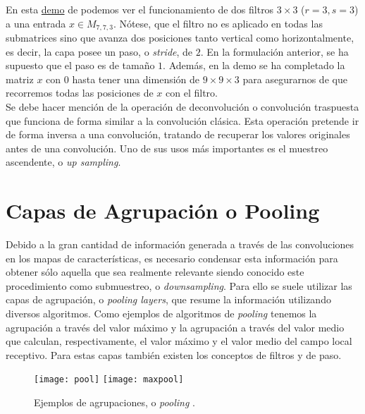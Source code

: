 \begin{itemize}
En esta \href{https://cs231n.github.io/assets/conv-demo/index.html}{demo} de \cite{stanford} podemos ver el funcionamiento de dos filtros $3\times 3$ ($r=3,s=3$) a una entrada $x\in M_{7,7,3}$. Nótese, que el filtro no es aplicado en todas las submatrices sino que avanza dos posiciones tanto vertical como horizontalmente, es decir, la capa posee un paso, o \emph{stride}, de $2$. En la formulación anterior, se ha supuesto que el paso es de tamaño $1$. Además, en la demo se ha completado la matriz $x$ con $0$ hasta tener una dimensión de $9\times 9\times 3$ para asegurarnos de que recorremos todas las posiciones de $x$ con el filtro. \\

Se debe hacer mención de la operación de deconvolución o convolución traspuesta que funciona de forma similar a la convolución clásica. Esta operación pretende ir de forma inversa a una convolución, tratando de recuperar los valores originales antes de una convolución. Uno de sus usos más importantes es el muestreo ascendente, o \emph{up sampling}.

\section{Capas de Agrupación o Pooling}
Debido a la gran cantidad de información generada a través de las convoluciones en los mapas de características, es necesario condensar esta información para obtener sólo aquella que sea realmente relevante siendo conocido este procedimiento como submuestreo, o \emph{downsampling}. Para ello se suele utilizar las capas de agrupación, o \emph{pooling layers}, que resume la información utilizando diversos algoritmos. Como ejemplos de algoritmos de \emph{pooling} tenemos la agrupación a través del valor máximo y la agrupación a través del valor medio que calculan, respectivamente, el valor máximo y el valor medio del campo local receptivo. Para estas capas también existen los conceptos de filtros y de paso.\\
\begin{figure}[htpb]
  \centering
  \texttt{[image: pool]}
  \vrule
  \texttt{[image: maxpool]}
  \caption{Ejemplos de agrupaciones, o \emph{pooling} \cite{stanford}. }
  \label{fig:pooling}
\end{figure}



\end{itemize}
